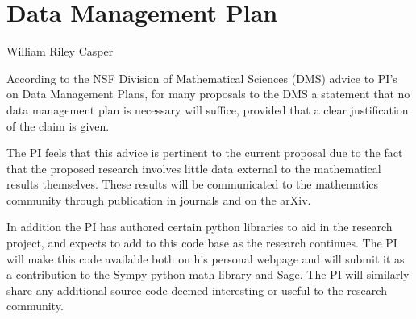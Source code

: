 \documentclass[11pt,letterpaper]{article}
\newcommand{\required}[1]{\section*{\hfil #1\hfil}}                    %
\theoremstyle{definition}
\begin{document}
\required{Data Management Plan}
\begin{center}
William Riley Casper
\end{center}

According to the NSF Division of Mathematical Sciences (DMS) advice to PI's on Data Management Plans, for many proposals to the DMS a statement that no data management plan is necessary will suffice, provided that a clear justification of the claim is given.

The PI feels that this advice is pertinent to the current proposal due to the fact that the proposed research involves little data external to the mathematical results themselves.  These results will be communicated to the mathematics community through publication in journals and on the arXiv.

In addition the PI has authored certain python libraries to aid in the research project, and expects to add to this code base as the research continues.  The PI will make this code available both on his personal webpage and will submit it as a contribution to the Sympy python math library and Sage.  The PI will similarly share any additional source code deemed interesting or useful to the research community.
\end{document}
